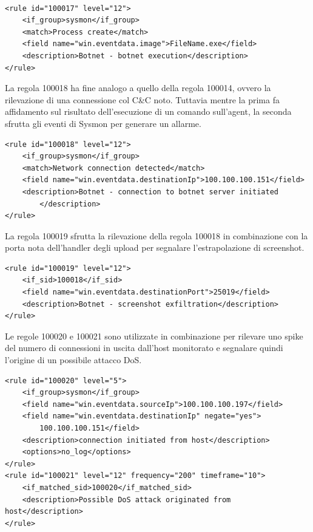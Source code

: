 \begin{lstlisting}
    
<rule id="100017" level="12">
    <if_group>sysmon</if_group>
    <match>Process create</match>
    <field name="win.eventdata.image">FileName.exe</field>
    <description>Botnet - botnet execution</description>
</rule>
\end{lstlisting}

La regola 100018 ha fine  analogo a quello della regola 100014, ovvero la rilevazione di una connessione col C\&C noto. Tuttavia mentre la prima fa affidamento sul risultato dell'esecuzione di un comando sull'agent, la seconda sfrutta gli eventi di Sysmon per generare un allarme.

\begin{lstlisting}
<rule id="100018" level="12">
    <if_group>sysmon</if_group>
    <match>Network connection detected</match>
    <field name="win.eventdata.destinationIp">100.100.100.151</field>
    <description>Botnet - connection to botnet server initiated
        </description>
</rule>
\end{lstlisting}

La regola 100019 sfrutta la rilevazione della regola 100018 in combinazione con la porta nota dell'handler degli upload per segnalare l'estrapolazione di screenshot.

\begin{lstlisting}  
<rule id="100019" level="12">
    <if_sid>100018</if_sid>
    <field name="win.eventdata.destinationPort">25019</field>
    <description>Botnet - screenshot exfiltration</description>
</rule>
\end{lstlisting}

Le regole 100020 e 100021 sono utilizzate in combinazione per rilevare uno spike del numero di connessioni in uscita dall'host monitorato e  segnalare quindi l'origine di un possibile attacco DoS.
\begin{lstlisting}
<rule id="100020" level="5">
    <if_group>sysmon</if_group>
    <field name="win.eventdata.sourceIp">100.100.100.197</field>
    <field name="win.eventdata.destinationIp" negate="yes">
        100.100.100.151</field>
    <description>connection initiated from host</description>
    <options>no_log</options>
</rule>
<rule id="100021" level="12" frequency="200" timeframe="10">
    <if_matched_sid>100020</if_matched_sid>
    <description>Possible DoS attack originated from host</description>
</rule>
\end{lstlisting}


